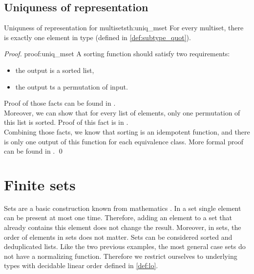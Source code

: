 \subsection{Uniquness of representation}
\begin{theo}{Uniquness of representation for multisets}{th:uniq_mset}
For every multiset, there is exactly one element in  type (defined in \ref{def:subtype_quot}). 
\end{theo}
\begin{proof}{}{proof:uniq_mset}
A sorting function should satisfy two requirements:
\begin{itemize}
    \itemsep 0em 
    \item the output is a sorted list,
    \item the output ts a permutation of input.
\end{itemize}
Proof of those facts can be found in .\\
Moreover, we can show that for every list of elements, only one permutation of this list is sorted. Proof of this fact is in .\\
Combining those facts, we know that sorting is an idempotent function, and there is only one output of this function for each equivalence class. More formal proof can be found in . \qed
\end{proof}
\section{Finite sets}
Sets are a basic construction known from mathematics \cite{SetTheorey}. In a set single element can be present at most one time. Therefore, adding an element to a set that already contains this element does not change the result. Moreover, in sets, the order of elements in sets does not matter. Sets can be considered sorted and deduplicated lists. Like the two previous examples, the most general case sets do not have a normalizing function. Therefore we restrict ourselves to underlying types with decidable linear order defined in \ref{def:lo}.

